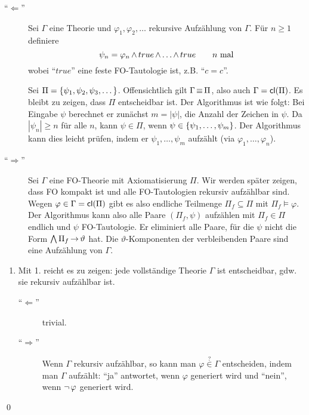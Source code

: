 \begin{description}
  \item[\enquote{$\Leftarrow$}]
  Sei $\Gamma$ eine Theorie und $\varphi_1, \varphi_2, \ldots$ rekursive
  Aufzählung von $\Gamma$.
  Für $n\geq1$ definiere
  \[
    \psi_n = \varphi_n \operatorname{\wedge} true \operatorname{\wedge} \dots \operatorname{\wedge} true \qquad \text{$n$ mal}
  \]
  wobei \enquote{$true$} eine feste FO-Tautologie ist, z.B. \enquote{$c=c$}.
  
  Sei $\Pi=\left\{\psi_1,\psi_2,\psi_3,\dots\right\}$. Offensichtlich gilt
  $\Gamma\operatorname{\equiv}\Pi$, also auch $\Gamma=\operatorname{\text{\textsf{cl}}}(\Pi)$. Es bleibt zu zeigen, dass $\Pi$
  entscheidbar ist. Der Algorithmus ist wie folgt: Bei Eingabe $\psi$
  berechnet er zunächst $m=|\psi|$, die Anzahl der Zeichen in $\psi$. Da
  $|\psi_n| \geq n$ für alle $n$, kann $\psi\in\Pi$, wenn
  $\psi\in\left\{\psi_1,\dots,\psi_m\right\}$. Der Algorithmus kann dies leicht prüfen,
  indem er $\psi_1,\dots,\psi_m$ aufzählt (via $\varphi_1,\dots,\varphi_n$).
    
  \item[\enquote{$\Rightarrow$}]
  Sei $\Gamma$ eine FO-Theorie mit Axiomatisierung $\Pi$. Wir werden später
  zeigen, dass FO kompakt ist und alle FO-Tautologien rekursiv aufzählbar
  sind. Wegen $\varphi\in\Gamma=\operatorname{\text{\textsf{cl}}}(\Pi)$ gibt es also endliche Teilmenge
  $\Pi_f\subseteq\Pi$ mit $\Pi_f\models\varphi$. Der Algorithmus kann also
  alle Paare $(\Pi_f,\psi)$ aufzählen mit $\Pi_f\in\Pi$ endlich und $\psi$
  FO-Tautologie. Er eliminiert alle Paare, für die $\psi$ nicht die Form
  $\operatorname*{\bigwedge}\Pi_f\operatorname{\rightarrow}\vartheta$ hat. Die $\vartheta$-Komponenten der verbleibenden Paare
  sind eine Aufzählung von $\Gamma$.
\end{description}

\begin{enumerate}[start=2]%
  \item Mit 1. reicht es zu zeigen: jede vollständige Theorie $\Gamma$
  ist entscheidbar, gdw. sie rekursiv aufzählbar ist.
  
  \begin{description}
    \item[\enquote{$\Leftarrow$}] trivial.
    \item[\enquote{$\Rightarrow$}]
    Wenn $\Gamma$ rekursiv aufzählbar, so kann man $\varphi\stackrel{?}{\in}\Gamma$
    entscheiden, indem man $\Gamma$ aufzählt: \enquote{ja} antwortet,
    wenn $\varphi$ generiert wird und \enquote{nein}, wenn $\operatorname{\neg}\varphi$
    generiert wird.
  \end{description}
\end{enumerate}
\qed
